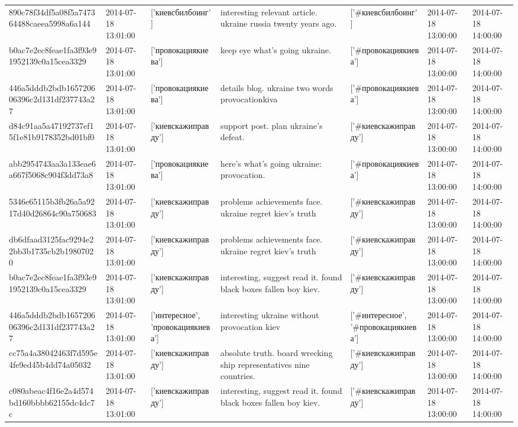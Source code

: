 \begin{tabular}{lllllll}
890c78f34df5a08f5a747364488caeea5998a6a144 & 2014-07-18 13:01:00 & ['киевсбилбоинг'] & interesting relevant article. ukraine russia twenty years ago. & ['#киевсбилбоинг'] & 2014-07-18 13:00:00 & 2014-07-18 14:00:00 \\
b0ac7e2ec8feae1fa3f93e91952139c0a15cea3329 & 2014-07-18 13:01:00 & ['провокациякиева'] & keep eye what's going ukraine. & ['#провокациякиева'] & 2014-07-18 13:00:00 & 2014-07-18 14:00:00 \\
446a5dddb2bdb165720606396c2d131df237743a27 & 2014-07-18 13:01:00 & ['провокациякиева'] & details blog. ukraine two words provocationkiva & ['#провокациякиева'] & 2014-07-18 13:00:00 & 2014-07-18 14:00:00 \\
d84c91aa5a47192737ef15f1e81b9178352bd01bf0 & 2014-07-18 13:01:00 & ['киевскажиправду'] & support post. plan ukraine's defeat. & ['#киевскажиправду'] & 2014-07-18 13:00:00 & 2014-07-18 14:00:00 \\
abb2954743aa3a133eae6a667f5068c904f3dd73a8 & 2014-07-18 13:01:00 & ['провокациякиева'] & here's what's going ukraine: provocation. & ['#провокациякиева'] & 2014-07-18 13:00:00 & 2014-07-18 14:00:00 \\
5346e65115b3fb26a5a9217d40d26864c90a750683 & 2014-07-18 13:01:00 & ['киевскажиправду'] & problems achievements face. ukraine regret kiev's truth & ['#киевскажиправду'] & 2014-07-18 13:00:00 & 2014-07-18 14:00:00 \\
db6dfaad3125fac9294e22bb3b1735cb2b19807020 & 2014-07-18 13:01:00 & ['киевскажиправду'] & problems achievements face. ukraine regret kiev's truth & ['#киевскажиправду'] & 2014-07-18 13:00:00 & 2014-07-18 14:00:00 \\
b0ac7e2ec8feae1fa3f93e91952139c0a15cea3329 & 2014-07-18 13:01:00 & ['киевскажиправду'] & interesting, suggest read it. found black boxes fallen boy kiev. & ['#киевскажиправду'] & 2014-07-18 13:00:00 & 2014-07-18 14:00:00 \\
446a5dddb2bdb165720606396c2d131df237743a27 & 2014-07-18 13:01:00 & ['интересное', 'провокациякиева'] & interesting ukraine without provocation kiev & ['#интересное', '#провокациякиева'] & 2014-07-18 13:00:00 & 2014-07-18 14:00:00 \\
cc75a4a38042463f7d595e4fe9ed45b4dd74a05032 & 2014-07-18 13:01:00 & ['киевскажиправду'] & absolute truth. board wrecking ship representatives nine countries. & ['#киевскажиправду'] & 2014-07-18 13:00:00 & 2014-07-18 14:00:00 \\
c080abeac4f16e2a4d574bd160bbbb62155dc4dc7c & 2014-07-18 13:01:00 & ['киевскажиправду'] & interesting, suggest read it. found black boxes fallen boy kiev. & ['#киевскажиправду'] & 2014-07-18 13:00:00 & 2014-07-18 14:00:00 \\

\end{tabular}
